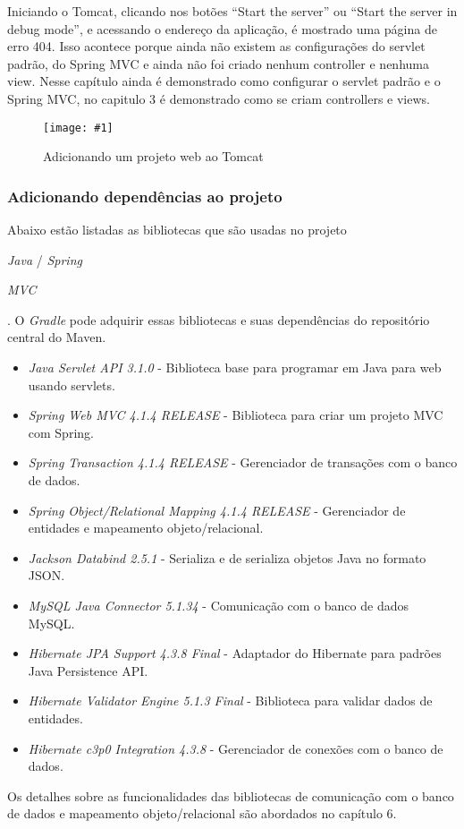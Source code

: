 \documentclass[a4paper,12pt]{article}
\newcommand{\spring} {
\lang{Java}/\est{Spring} \sigla{MVC}
}
\newcommand{\figura}[3] {
	\begin{figure}[ht]
		\centering
		\texttt{[image: \#1]}
		\caption{#2}
		\label{#3}
	\end{figure}
	\FloatBarrier
}
\newcommand{\est}[1] {
	\textit{#1}
}
\newcommand{\sigla}[1] {
	\textit{#1}
}
\newcommand{\lang}[1] {
	\textit{#1}
}
\newcommand{\lib}[1] {
	\textit{#1}
}
\begin{document}
Iniciando o Tomcat, clicando nos botões “Start the server” ou “Start the server in debug mode”, e acessando o endereço da aplicação, é mostrado uma página de erro 404. Isso acontece porque ainda não existem as configurações do servlet padrão, do Spring MVC e ainda não foi criado nenhum controller e nenhuma view. Nesse capítulo ainda é demonstrado como configurar o servlet padrão e o Spring MVC, no capitulo 3 é demonstrado como se criam controllers e views.

\figura{tomcatproject.png}{Adicionando um projeto web ao Tomcat}{fig:14}

\subsubsection{Adicionando dependências ao projeto}

Abaixo estão listadas as bibliotecas que são usadas no projeto \spring. O \est{Gradle} pode adquirir essas bibliotecas e suas dependências do repositório central do Maven.

\begin{itemize}
  \item \lib{Java Servlet API 3.1.0} - Biblioteca base para programar em Java para web usando servlets.
  \item \lib{Spring Web MVC 4.1.4 RELEASE} - Biblioteca para criar um projeto MVC com Spring.
  \item \lib{Spring Transaction 4.1.4 RELEASE} - Gerenciador de transações com o banco de dados.
  \item \lib{Spring Object/Relational Mapping 4.1.4 RELEASE} - Gerenciador de entidades e mapeamento objeto/relacional.
  \item \lib{Jackson Databind 2.5.1} - Serializa e de serializa objetos Java no formato JSON.
  \item \lib{MySQL Java Connector 5.1.34} - Comunicação com o banco de dados MySQL.
  \item \lib{Hibernate JPA Support 4.3.8 Final} - Adaptador do Hibernate para padrões Java Persistence API.
  \item \lib{Hibernate Validator Engine 5.1.3 Final} - Biblioteca para validar dados de entidades.
  \item \lib{Hibernate c3p0 Integration 4.3.8} - Gerenciador de conexões com o banco de dados.
\end{itemize}

Os detalhes sobre as funcionalidades das bibliotecas de comunicação com o banco de dados e mapeamento objeto/relacional são abordados no capítulo 6. 
\end{document}

